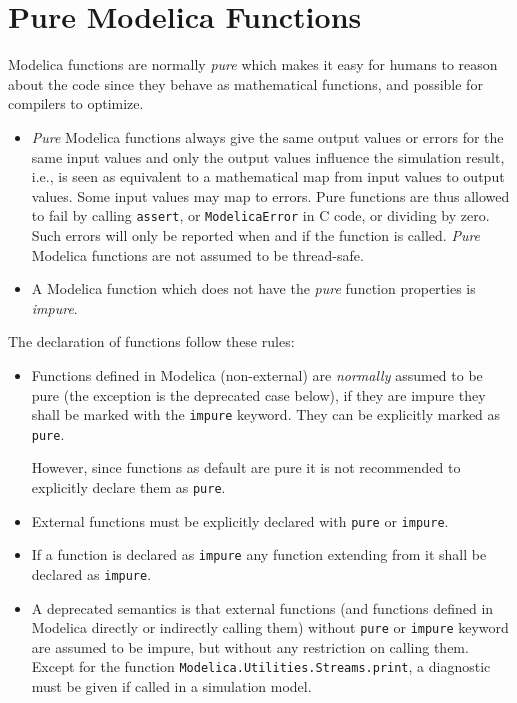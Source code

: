 \section{Pure Modelica Functions}\label{pure-modelica-functions}

Modelica functions are normally \emph{pure} which makes it easy for
humans to reason about the code since they behave as mathematical
functions, and possible for compilers to optimize.

\begin{itemize}
\item
  \emph{Pure} Modelica functions always give the same output values or
  errors for the same input values and only the output values influence
  the simulation result, i.e., is seen as equivalent to a mathematical
  map from input values to output values. Some input values may map to
  errors. Pure functions are thus allowed to fail by calling \lstinline!assert!, or
  \lstinline[language=C]!ModelicaError! in C code, or dividing by zero. Such errors will only be
  reported when and if the function is called.  \emph{Pure} Modelica
  functions are not assumed to be thread-safe.
\item
  A Modelica function which does not have the \emph{pure} function
  properties is \emph{impure}.
\end{itemize}

The declaration of functions follow these rules:
\begin{itemize}
\item
  Functions defined in Modelica (non-external) are \emph{normally} assumed to be pure (the exception is the deprecated case below), if they are impure they shall be marked with the \lstinline!impure! keyword.
  They can be explicitly marked as \lstinline!pure!.
  \begin{nonnormative}
  However, since functions as default are pure it is not recommended to explicitly declare them as \lstinline!pure!.
  \end{nonnormative}
\item
  External functions must be explicitly declared with \lstinline!pure! or \lstinline!impure!.
\item
  If a function is declared as \lstinline!impure! any function extending from it shall be declared as \lstinline!impure!.
\item
  A deprecated semantics is that external functions (and functions defined in Modelica directly or indirectly calling them) without \lstinline!pure! or \lstinline!impure! keyword are assumed to be impure, but without any restriction on calling them.
  Except for the function \lstinline!Modelica.Utilities.Streams.print!, a diagnostic must be given if called in a simulation model.
\end{itemize}

